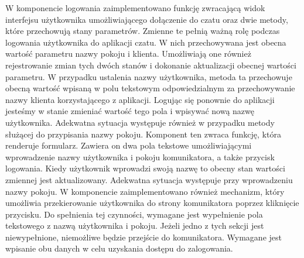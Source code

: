 \newpage
W komponencie logowania zaimplementowano funkcję zwracającą widok interfejsu użytkownika umożliwiającego dołączenie do czatu oraz dwie metody, które przechowują stany parametrów. Zmienne te pełnią ważną rolę podczas logowania użytkownika do aplikacji czatu. W nich przechowywana jest obecna wartość parametru nazwy pokoju i klienta. Umożliwiają one również rejestrowanie zmian tych dwóch stanów i dokonanie aktualizacji obecnej wartości parametru. W przypadku ustalenia nazwy użytkownika, metoda ta przechowuje obecną wartość wpisaną w polu tekstowym odpowiedzialnym za przechowywanie nazwy klienta korzystającego z aplikacji. Logując się ponownie do aplikacji jesteśmy w stanie zmieniać wartość tego pola i wpisywać nową nazwę użytkownika. Adekwatna sytuacja występuje również w przypadku metody służącej do przypisania nazwy pokoju. Komponent ten zwraca funkcję, która renderuje formularz. Zawiera on dwa pola tekstowe umożliwiającymi wprowadzenie nazwy użytkownika i pokoju komunikatora, a także przycisk logowania. Kiedy użytkownik wprowadzi swoją nazwę to obecny stan wartości zmiennej jest aktualizowany. Adekwatna sytuacja występuje przy wprowadzeniu nazwy pokoju. W komponencie zaimplementowano również mechanizm, który umożliwia przekierowanie użytkownika do strony komunikatora poprzez kliknięcie przycisku. Do spełnienia tej czynności, wymagane jest wypełnienie pola tekstowego z nazwą użytkownika i pokoju. Jeżeli jedno z tych sekcji jest niewypełnione, niemożliwe będzie przejście do komunikatora. Wymagane jest wpisanie obu danych w celu uzyskania dostępu do zalogowania.
